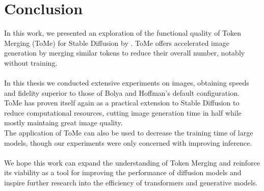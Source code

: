 \section{Conclusion}
In this work, we presented an exploration of the functional quality of Token Merging (ToMe) for Stable Diffusion by \cite{bolya2023tomesd}. ToMe offers accelerated image generation by merging similar tokens to reduce their overall number, notably without training.\\
\\
In this thesis we conducted extensive experiments on images, obtaining speeds and fidelity superior to those of Bolya and Hoffman's default configuration.\\
ToMe has proven itself again as a practical extension to Stable Diffusion to reduce computational resources, cutting image generation time in half while mostly maintaing great image quality.\\
The application of ToMe can also be used to decrease the training time of large models, though our experiments were only concerned with improving inference.\\
\\
We hope this work can expand the understanding of Token Merging and reinforce its viability as a tool for improving the performance of diffusion models and inspire further research into the efficiency of transformers and generative models.\\



